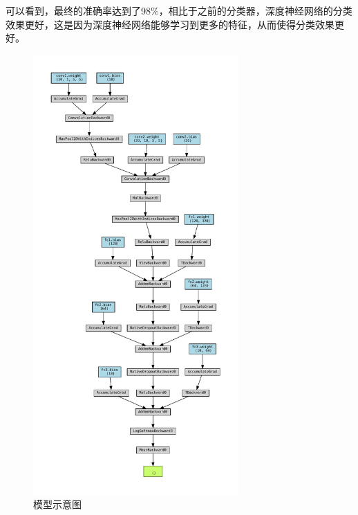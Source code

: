 \documentclass[UTF8]{ctexart}
\begin{document}
\indent 可以看到，最终的准确率达到了98\%，相比于之前的分类器，深度神经网络的分类效果更好，这是因为深度神经网络能够学习到更多的特征，从而使得分类效果更好。
\begin{figure}[h]
    \centering
    \includegraphics[width=0.7\textwidth]{./image/model.pdf}
    \caption{模型示意图}
    \label{fig:network}
\end{figure}
\end{document}

